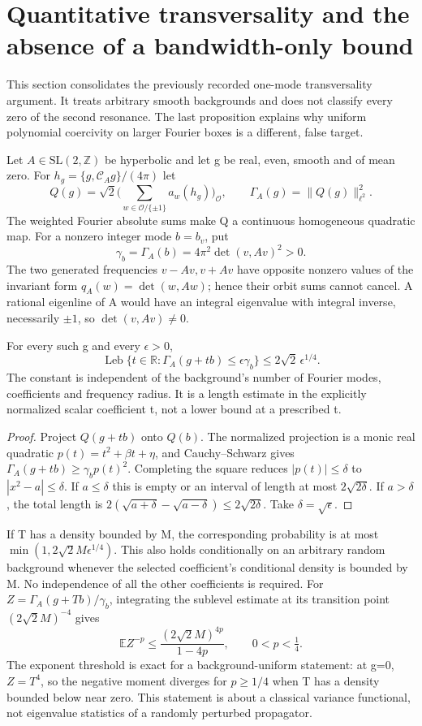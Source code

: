 \section{Quantitative transversality and the absence of a bandwidth-only bound}
\label{sec:transversality}
This section consolidates the previously recorded one-mode transversality
argument. It treats arbitrary smooth backgrounds and does not classify every
zero of the second resonance. The last proposition explains why uniform
polynomial coercivity on larger Fourier boxes is a different, false target.

Let $A\in\mathrm{SL}(2,\mathbb Z)$ be hyperbolic and let g be real, even,
smooth and of mean zero. For $h_g=\{g,\mathcal C_Ag\}/(4\pi)$ let
\[
 Q(g)=\sqrt2\biggl(\sum_{w\in\mathcal O/\{\pm1\}}a_w(h_g)\biggr)_{\mathcal O},
 \qquad \Gamma_A(g)=\|Q(g)\|_{\ell^2}^2.
\]
The weighted Fourier absolute sums make Q a continuous homogeneous quadratic
map. For a nonzero integer mode $b=b_v$, put
\[
 \gamma_b=\Gamma_A(b)=4\pi^2\det(v,Av)^2>0.
\]
The two generated frequencies $v-Av,v+Av$ have opposite nonzero values of
the invariant form $q_A(w)=\det(w,Aw)$; hence their orbit sums cannot cancel.
A rational eigenline of A would have an integral eigenvalue with integral
inverse, necessarily $\pm1$, so $\det(v,Av)\ne0$.

\begin{theorem}
For every such g and every $\epsilon>0$,
\[
 \operatorname{Leb}\{t\in\mathbb R:\Gamma_A(g+tb)\leq\epsilon\gamma_b\}
       \leq 2\sqrt2\,\epsilon^{1/4}.
\]
The constant is independent of the background's number of Fourier modes,
coefficients and frequency radius. It is a length estimate in the explicitly
normalized scalar coefficient t, not a lower bound at a prescribed t.
\end{theorem}
\begin{proof}
Project $Q(g+tb)$ onto $Q(b)$. The normalized projection is a monic real
quadratic $p(t)=t^2+\beta t+\eta$, and Cauchy--Schwarz gives
$\Gamma_A(g+tb)\geq\gamma_b p(t)^2$. Completing the square reduces
$|p(t)|\leq\delta$ to $|x^2-a|\leq\delta$. If $a\leq\delta$ this is empty
or an interval of length at most $2\sqrt{2\delta}$. If $a>\delta$, the total
length is
$2(\sqrt{a+\delta}-\sqrt{a-\delta})\leq2\sqrt{2\delta}$.
Take $\delta=\sqrt\epsilon$.
\end{proof}

If T has a density bounded by M, the corresponding probability is at most
$\min(1,2\sqrt2 M\epsilon^{1/4})$. This also holds conditionally on an
arbitrary random background whenever the selected coefficient's conditional
density is bounded by M. No independence of all the other coefficients is
required. For $Z=\Gamma_A(g+Tb)/\gamma_b$, integrating the sublevel estimate
at its transition point $(2\sqrt2 M)^{-4}$ gives
\[
 \mathbb E Z^{-p}\leq\frac{(2\sqrt2 M)^{4p}}{1-4p},
                 \qquad 0<p<\tfrac14.
\]
The exponent threshold is exact for a background-uniform statement: at g=0,
$Z=T^4$, so the negative moment diverges for $p\geq1/4$ when T has a density
bounded below near zero. This statement is about a classical variance
functional, not eigenvalue statistics of a randomly perturbed propagator.

